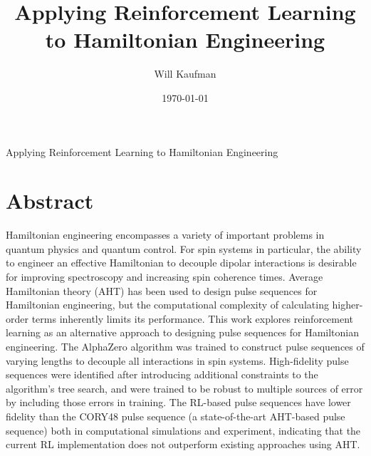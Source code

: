 \documentclass[
11pt,
english,
]{dcthesis}
\title{Applying Reinforcement Learning to Hamiltonian Engineering}
\author{Will Kaufman}
\date{\today}
\theoremstyle{definition}
\theoremstyle{remark}
\begin{document}
\begin{center}
\vspace*{\fill}

\huge
Applying Reinforcement Learning to Hamiltonian Engineering

\vspace*{\fill}
\end{center}

\normalsize
\newpage\null\thispagestyle{empty}\newpage

\frontmatter

\maketitle


\chapter*{Abstract}

Hamiltonian engineering encompasses a variety of important problems in quantum physics and quantum control. For spin systems in particular, the ability to engineer an effective Hamiltonian to decouple dipolar interactions is desirable for improving spectroscopy and increasing spin coherence times.
Average Hamiltonian theory (AHT) has been used to design pulse sequences for Hamiltonian engineering, but the computational complexity of calculating higher-order terms inherently limits its performance.
This work explores reinforcement learning as an alternative approach to designing pulse sequences for Hamiltonian engineering. The AlphaZero algorithm was trained to construct pulse sequences of varying lengths to decouple all interactions in spin systems. High-fidelity pulse sequences were identified after introducing additional constraints to the algorithm's tree search, and were trained to be robust to multiple sources of error by including those errors in training.
The RL-based pulse sequences have lower fidelity than the CORY48 pulse sequence (a state-of-the-art AHT-based pulse sequence) both in computational simulations and experiment, indicating that the current RL implementation does not outperform existing approaches using AHT.
\end{document}
